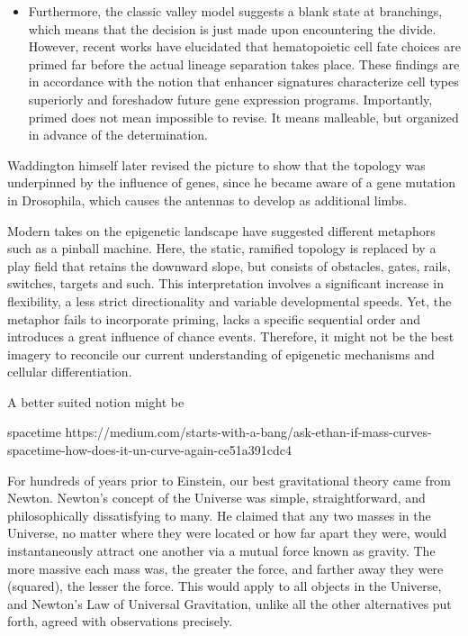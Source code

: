 \begin{itemize}
	 \item Furthermore, the classic valley model suggests a blank state at branchings, which means that the decision is just made upon encountering the divide. However, recent works have elucidated that hematopoietic cell fate choices are primed far before the actual lineage separation takes place\cite{Paul2015,Drissen2016,Buenrostro2018}. These findings are in accordance with the notion that enhancer signatures characterize cell types superiorly and foreshadow future gene expression programs\cite{Lara-Astiaso2014,Arner2015,Corces2016}. Importantly, primed does not mean impossible to revise. It means malleable, but organized in advance of the determination.
\end{itemize}

Waddington himself later revised the picture to show that the topology was underpinned by the influence of genes, since he became aware of a gene mutation in Drosophila, which causes the antennas to develop as additional limbs. 

Modern takes on the epigenetic landscape have suggested different metaphors such as a pinball machine\cite{Goldberg2007}. Here, the static, ramified topology is replaced by a play field that retains the downward slope, but consists of obstacles, gates, rails, switches, targets and such. This interpretation involves a significant increase in flexibility, a less strict directionality and variable developmental speeds. Yet, the metaphor fails to incorporate priming, lacks a specific sequential order and introduces a great influence of chance events. Therefore, it might not be the best imagery to reconcile our current understanding of epigenetic mechanisms and cellular differentiation.   

A better suited notion might be 

spacetime
https://medium.com/starts-with-a-bang/ask-ethan-if-mass-curves-spacetime-how-does-it-un-curve-again-ce51a391cdc4

For hundreds of years prior to Einstein, our best gravitational theory came from Newton. Newton’s concept of the Universe was simple, straightforward, and philosophically dissatisfying to many. He claimed that any two masses in the Universe, no matter where they were located or how far apart they were, would instantaneously attract one another via a mutual force known as gravity. The more massive each mass was, the greater the force, and farther away they were (squared), the lesser the force. This would apply to all objects in the Universe, and Newton’s Law of Universal Gravitation, unlike all the other alternatives put forth, agreed with observations precisely.

